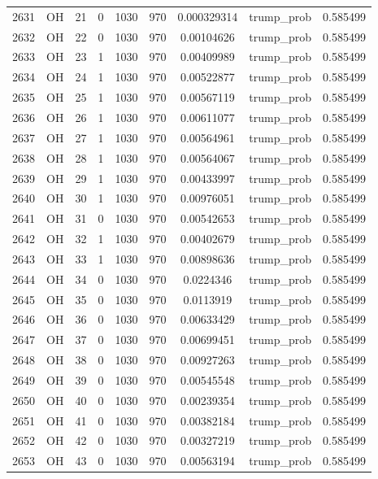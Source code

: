 \documentclass[12pt,a4paper]{article}
\begin{document}
\begin{tabular}{r|cccccccc}
	2631 & OH & 21 & 0 & 1030 & 970 & 0.000329314 & trump\_prob & 0.585499 \\
	2632 & OH & 22 & 0 & 1030 & 970 & 0.00104626 & trump\_prob & 0.585499 \\
	2633 & OH & 23 & 1 & 1030 & 970 & 0.00409989 & trump\_prob & 0.585499 \\
	2634 & OH & 24 & 1 & 1030 & 970 & 0.00522877 & trump\_prob & 0.585499 \\
	2635 & OH & 25 & 1 & 1030 & 970 & 0.00567119 & trump\_prob & 0.585499 \\
	2636 & OH & 26 & 1 & 1030 & 970 & 0.00611077 & trump\_prob & 0.585499 \\
	2637 & OH & 27 & 1 & 1030 & 970 & 0.00564961 & trump\_prob & 0.585499 \\
	2638 & OH & 28 & 1 & 1030 & 970 & 0.00564067 & trump\_prob & 0.585499 \\
	2639 & OH & 29 & 1 & 1030 & 970 & 0.00433997 & trump\_prob & 0.585499 \\
	2640 & OH & 30 & 1 & 1030 & 970 & 0.00976051 & trump\_prob & 0.585499 \\
	2641 & OH & 31 & 0 & 1030 & 970 & 0.00542653 & trump\_prob & 0.585499 \\
	2642 & OH & 32 & 1 & 1030 & 970 & 0.00402679 & trump\_prob & 0.585499 \\
	2643 & OH & 33 & 1 & 1030 & 970 & 0.00898636 & trump\_prob & 0.585499 \\
	2644 & OH & 34 & 0 & 1030 & 970 & 0.0224346 & trump\_prob & 0.585499 \\
	2645 & OH & 35 & 0 & 1030 & 970 & 0.0113919 & trump\_prob & 0.585499 \\
	2646 & OH & 36 & 0 & 1030 & 970 & 0.00633429 & trump\_prob & 0.585499 \\
	2647 & OH & 37 & 0 & 1030 & 970 & 0.00699451 & trump\_prob & 0.585499 \\
	2648 & OH & 38 & 0 & 1030 & 970 & 0.00927263 & trump\_prob & 0.585499 \\
	2649 & OH & 39 & 0 & 1030 & 970 & 0.00545548 & trump\_prob & 0.585499 \\
	2650 & OH & 40 & 0 & 1030 & 970 & 0.00239354 & trump\_prob & 0.585499 \\
	2651 & OH & 41 & 0 & 1030 & 970 & 0.00382184 & trump\_prob & 0.585499 \\
	2652 & OH & 42 & 0 & 1030 & 970 & 0.00327219 & trump\_prob & 0.585499 \\
	2653 & OH & 43 & 0 & 1030 & 970 & 0.00563194 & trump\_prob & 0.585499 \\

\end{tabular}
\end{document}
